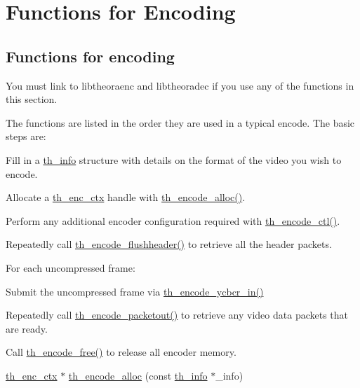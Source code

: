 \hypertarget{group__encfuncs}{\section{Functions for Encoding}
\label{group__encfuncs}
}
\subsection*{Functions for encoding}
\label{_amgrpc58fb8743a7ca83eb895d57e29e032c8}%
You must link to {\ttfamily libtheoraenc} and {\ttfamily libtheoradec} if you use any of the functions in this section.

The functions are listed in the order they are used in a typical encode. The basic steps are\+:
\begin{DoxyItemize}
\item Fill in a \hyperlink{structth__info}{th\+\_\+info} structure with details on the format of the video you wish to encode.
\item Allocate a \hyperlink{structth__enc__ctx}{th\+\_\+enc\+\_\+ctx} handle with \hyperlink{group__encfuncs_gaa91e47bc9dd5f6ee52045bd7b815e5a7}{th\+\_\+encode\+\_\+alloc()}.
\item Perform any additional encoder configuration required with \hyperlink{group__encfuncs_ga3a427f6514dfdc01ea72172c469d51d9}{th\+\_\+encode\+\_\+ctl()}.
\item Repeatedly call \hyperlink{group__encfuncs_ga9439d61b566039d194ff782681fbc408}{th\+\_\+encode\+\_\+flushheader()} to retrieve all the header packets.
\item For each uncompressed frame\+:
\begin{DoxyItemize}
\item Submit the uncompressed frame via \hyperlink{group__encfuncs_gadbe7dd66b411c2d61ab8153c15308750}{th\+\_\+encode\+\_\+ycbcr\+\_\+in()}
\item Repeatedly call \hyperlink{group__encfuncs_ga96d8ac1dda53187455352f99bbb5b04b}{th\+\_\+encode\+\_\+packetout()} to retrieve any video data packets that are ready.
\end{DoxyItemize}
\item Call \hyperlink{group__encfuncs_ga36b23d216532231925c4107894204680}{th\+\_\+encode\+\_\+free()} to release all encoder memory. 
\end{DoxyItemize}\begin{DoxyCompactItemize}
\item 
\hyperlink{structth__enc__ctx}{th\+\_\+enc\+\_\+ctx} $\ast$ \hyperlink{group__encfuncs_gaa91e47bc9dd5f6ee52045bd7b815e5a7}{th\+\_\+encode\+\_\+alloc} (const \hyperlink{structth__info}{th\+\_\+info} $\ast$\+\_\+info)

\end{DoxyCompactItemize}
